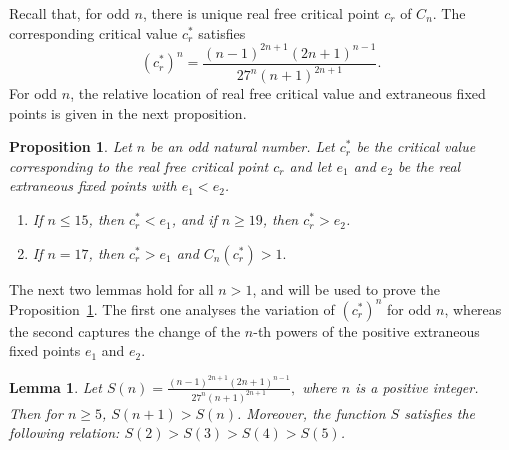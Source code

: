 \documentclass[12pt]{article}
\newtheorem{lem}{Lemma}[section]
\newtheorem{prop}{Proposition}[section]
\begin{document}
	Recall that, for odd $n$, there is unique real free critical point $c_r$ of $C_n$.  The corresponding  critical value $c_r^*$  satisfies
\begin{equation}
	 (c_r^*)^n =\frac{(n-1)^{2n+1}(2n+1)^{n-1}}{27^n(n+1)^{2n+1}}.
	 \label{realcriticalvalue}
\end{equation}
For odd $n$, the relative location of real free critical value and extraneous fixed points is given in the next proposition.
	\begin{prop}\label{Odd_free_cr}
		Let $n$ be an odd natural number. Let $c_r^*$ be the critical value corresponding to the real free critical point $c_r$ and let $e_1$ and $e_2$ be the real extraneous fixed points with $e_1<e_2$.
		\begin{enumerate}
			\item If $n\leq 15$, then $c_r^*<e_1$, and if $n\geq 19$, then $c_r^*>e_2$.
			\item If $n=17$, then $c_r ^* > e_1$ and  $C_n (c_r ^*)>1.$
		\end{enumerate}
	\end{prop}
The next two lemmas hold for all $n>1$, and will be used to prove the Proposition~\ref{Odd_free_cr}. The first one analyses the variation of $(c_r ^*)^n$ for odd $n$, whereas the second captures the change of the $n$-th powers of the positive extraneous fixed points $e_1$ and $e_2$.
	\begin{lem}\label{fn_S}
		Let $S(n)=\frac{(n-1)^{2n+1}(2n+1)^{n-1}}{27^n(n+1)^{2n+1}},$ where $n$ is a positive integer. Then for $n\geq 5$, $S(n+1)>S(n)$. Moreover, the function $S$ satisfies the following relation: $S(2)>S(3)>S(4)>S(5)$.
	\end{lem}
	
\end{document}
